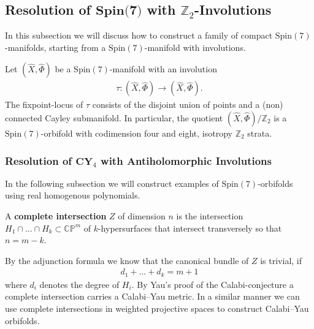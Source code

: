 \documentclass[psamsfonts]{amsart}
\theoremstyle{plain}
\theoremstyle{definition}{
\newtheorem{defi}{Definition}[section]
\newtheorem{ass}{Assumption}
\newtheorem*{nota}{Notation}}
\theoremstyle{remark}{
\newtheorem{rem}{Remark}
\newtheorem{ex}{Example}}
\theoremstyle{plain}{
\newtheorem{thm}{Theorem}[section]
\newtheorem{lem}{Lemma}[section]
\newtheorem{cor}{Corollary}[section]
\newtheorem{prop}{Proposition}[section]
\newtheorem{con}{Conjecture}[section]}
\newcommand{\m}[1]{{\mathrm{#1}}}
\newcommand{\cat}[1]{\textbf{#1}}
\begin{document}
\subsection{Resolution of $\cat{Spin(7)}$ with $\mathbb{Z}_2$-Involutions}
\label{Resolutions of Spin(7) Z2 Involutions}


In this subsection we will discuss how to construct a family of compact $\m{Spin}(7)$-manifolds, starting from a $\m{Spin}(7)$-manifold with involutions.\\

\begin{lem}\cite[Prop. 10.8.6]{joyce2000compact}
    Let $(\hat{X},\hat{\Phi})$ be a $\m{Spin}(7)$-manifold with an involution 
    \begin{align*}
        \tau\colon (\hat{X},\hat{\Phi})\rightarrow (\hat{X},\hat{\Phi}).
    \end{align*}
    The fixpoint-locus of $\tau$ consists of the disjoint union of points and a (non) connected Cayley submanifold. In particular, the quotient $(\hat{X},\hat{\Phi})/\mathbb{Z}_2$ is a $\m{Spin}(7)$-orbifold with codimension four and eight, isotropy $\mathbb{Z}_2$ strata. 
\end{lem}

\subsubsection{Resolution of $\cat{CY}_4$ with Antiholomorphic Involutions}
\label{Resolving CY4 with Antiholomorphic Involutions}

In the following subsection we will construct examples of $\m{Spin}(7)$-orbifolds using real homogenous polynomials.

\begin{defi}
    A \textbf{complete intersection} $Z$ of dimension $n$ is the intersection $H_1\cap ...\cap H_k\subset \mathbb{CP}^m$ of $k$-hypersurfaces that intersect transversely so that $n=m-k$.
\end{defi}
By the adjunction formula we know that the canonical bundle of $Z$ is trivial, if 
\begin{align*}
    d_1+...+d_k=m+1
\end{align*}
where $d_i$ denotes the degree of $H_i$. By Yau's proof of the Calabi-conjecture \cite{Yau1977Calabi} a complete intersection carries a Calabi--Yau metric. In a similar manner we can use complete intersections in weighted projective spaces to construct Calabi--Yau orbifolds.\\
\end{document}
